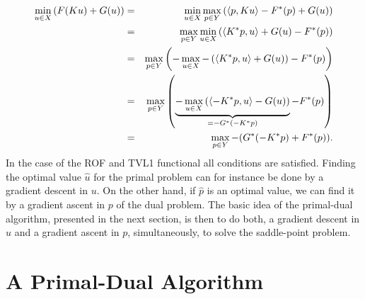 \documentclass[abstracton]{scrreprt}
\begin{document}
            \begin{eqnarray}
                \min_{u \in X} \left(F(Ku) + G(u)\right) &=& \min_{u \in X} \max_{p \in Y} \left(\langle p, Ku \rangle - F^{\ast}(p) + G(u) \right) \notag \\
                &=& \max_{p \in Y} \min_{u \in X} \left(\langle K^{\ast}p, u \rangle + G(u) - F^{\ast}(p) \right) \notag \\
                &=& \max_{p \in Y} \left( -\max_{u \in X} -\left( \langle K^{\ast}p, u \rangle + G(u) \right) - F^{\ast}(p) \right) \notag \\
                &=& \max_{p \in Y} \left( \underbrace{-\max_{u \in X} \left( \langle -K^{\ast}p, u \rangle - G(u) \right)}_{= -G^{\ast}(-K^{\ast}p)} - F^{\ast}(p) \right) \notag \\
                &=& \max_{p \in Y} -(G^{\ast}(-K^{\ast}p) + F^{\ast}(p)). \notag
            \end{eqnarray}
        In the case of the ROF and TVL1 functional all conditions are satisfied. Finding the optimal value $\hat{u}$ for the primal problem can for instance be done by a gradient descent in $u$. On the other hand, if $\hat{p}$ is an optimal value, we can find it by a gradient ascent in $p$ of the dual problem. The basic idea of the primal-dual algorithm, presented in the next section, is then to do both, a gradient descent in $u$ and a gradient ascent in $p$, simultaneously, to solve the saddle-point problem.

    \section{A Primal-Dual Algorithm} %
    \label{sec:a_firs_order_primal_dual_algorithm}
\end{document}
